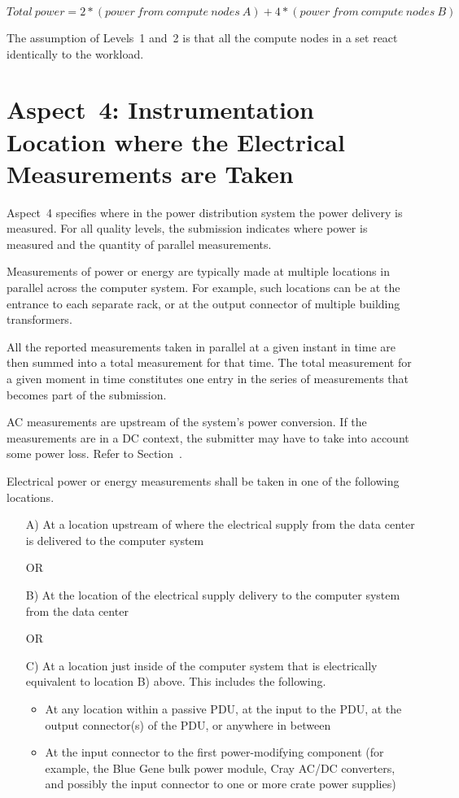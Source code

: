 \[ Total~power=2*(power~from~compute~nodes~A) + 4*(power~from~compute~nodes~B) \]

The assumption of Levels~1 and~2 is that all the compute nodes in a set react identically to the workload.


\section{Aspect~4: Instrumentation Location where the Electrical Measurements are Taken}
\label{sec:A4wEMaT}
Aspect~4 specifies where in the power distribution system the power delivery is measured.
For all quality levels, the submission indicates where power is measured and the quantity of parallel measurements.

Measurements of power or energy are typically made at multiple locations in parallel across the computer system.
For example, such locations can be at the entrance to each separate rack, or at the output connector of multiple building transformers.

All the reported measurements taken in parallel at a given instant in time are then summed into a total measurement for that time.
The total measurement for a given moment in time constitutes one entry in the series of measurements that becomes part of the submission.

AC measurements are upstream of the system's power conversion.
If the measurements are in a DC context, the submitter may have to take into account some power loss.
Refer to Section~.

Electrical power or energy measurements shall be taken in one of the following locations.

\begin{itemize}
\item[{A)}]
At a location upstream of where the electrical supply from the data center is delivered to the computer system

OR

\item[{B)}]
At the location of the electrical supply delivery to the computer system from the data center

OR

\item[{C)}]
At a location just inside of the computer system that is electrically equivalent to location B) above.
This includes the following.

\begin{itemize}
\item
At any location within a passive PDU, at the input to the PDU, at the output connector(s) of the PDU, or anywhere in between 
\item
At the input connector to the first power-modifying component (for example, the Blue Gene bulk power module, Cray AC/DC converters, and possibly the input connector to one or more crate power supplies)
\end{itemize}
\end{itemize}

